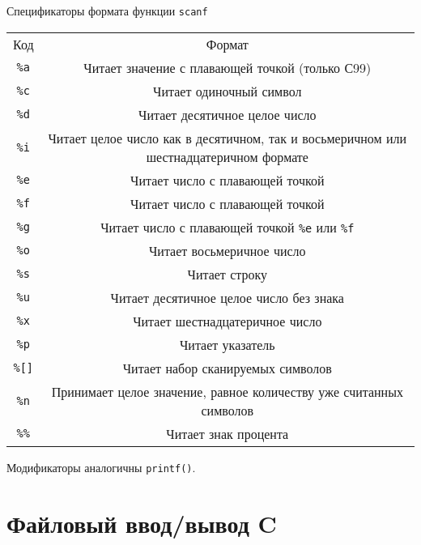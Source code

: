 \documentclass {article}
\begin{document}
\begin{center}
Спецификаторы формата функции \texttt{scanf}
\begin{tabular}{c c}
\rowcolor[rgb]{0.8,0.2,0.2} Код & Формат \\\tabrowsep
\rowcolor[rgb]{0.7,0.7,0.7} \texttt{\%a} & Читает значение с плавающей точкой (только С99)    \\\tabrowsep
\rowcolor[rgb]{0.7,0.7,0.7} \texttt{\%c} & Читает одиночный символ  \\\tabrowsep
\rowcolor[rgb]{0.7,0.7,0.7} \texttt{\%d} & Читает десятичное целое число   \\\tabrowsep
\rowcolor[rgb]{0.7,0.7,0.7} \texttt{\%i} &  Читает целое число как в десятичном, так и восьмеричном или шестнадцатеричном формате  \\\tabrowsep
\rowcolor[rgb]{0.7,0.7,0.7} \texttt{\%e} &  Читает число с плавающей точкой \\\tabrowsep
\rowcolor[rgb]{0.7,0.7,0.7} \texttt{\%f} &   Читает число с плавающей точкой \\\tabrowsep
\rowcolor[rgb]{0.7,0.7,0.7} \texttt{\%g} & Читает число с плавающей точкой  \texttt{\%e} или  \texttt{\%f} \\\tabrowsep
\rowcolor[rgb]{0.7,0.7,0.7} \texttt{\%o} &  Читает восьмеричное число  \\\tabrowsep
\rowcolor[rgb]{0.7,0.7,0.7} \texttt{\%s} & Читает строку  \\\tabrowsep
\rowcolor[rgb]{0.7,0.7,0.7} \texttt{\%u} &  Читает десятичное целое число без знака \\\tabrowsep
\rowcolor[rgb]{0.7,0.7,0.7} \texttt{\%x} &  Читает шестнадцатеричное число\\\tabrowsep
\rowcolor[rgb]{0.7,0.7,0.7} \texttt{\%p} &  Читает указатель  \\\tabrowsep
\rowcolor[rgb]{0.7,0.7,0.7} \texttt{\%[]} &  Читает набор сканируемых символов  \\\tabrowsep
\rowcolor[rgb]{0.7,0.7,0.7} \texttt{\%n} &  Принимает целое значение, равное количеству уже считанных символов  \\\tabrowsep
\rowcolor[rgb]{0.7,0.7,0.7} \texttt{\%\%} & Читает знак процента  \\
\end{tabular}
\end{center}
Модификаторы аналогичны \texttt{printf()}.
\section{Файловый ввод/вывод C}
\end{document}
